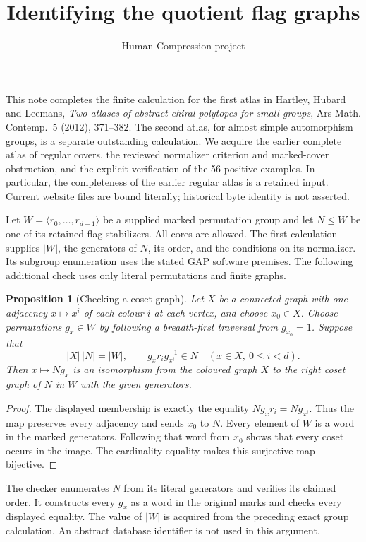 \documentclass[11pt,a4paper]{article}
\title{Identifying the quotient flag graphs}
\author{Human Compression project}\date{}
\newtheorem{proposition}{Proposition}
\begin{document}
\maketitle
This note completes the finite calculation for the first atlas in
Hartley, Hubard and Leemans, \emph{Two atlases of abstract chiral polytopes
for small groups}, Ars Math. Contemp.~5 (2012), 371--382. The second atlas,
for almost simple automorphism groups, is a separate outstanding calculation.
We acquire the earlier complete atlas of regular covers, the reviewed
normalizer criterion and marked-cover obstruction, and the explicit
verification of the 56 positive examples. In particular, the completeness
of the earlier regular atlas is a retained input. Current website files
are bound literally; historical byte identity is not asserted.

Let $W=\langle r_0,\ldots,r_{d-1}\rangle$ be a supplied marked permutation
group and let $N\le W$ be one of its retained flag stabilizers. All cores
are allowed. The first calculation supplies $|W|$, the generators of $N$,
its order, and the conditions on its normalizer. Its subgroup enumeration
uses the stated GAP software premises. The following additional check
uses only literal permutations and finite graphs.

\begin{proposition}[Checking a coset graph]
Let $X$ be a connected graph with one adjacency $x\mapsto x^i$ of each
colour $i$ at each vertex, and choose $x_0\in X$. Choose permutations
$g_x\in W$ by following a breadth-first traversal from $g_{x_0}=1$.
Suppose that
\[
 |X|\,|N|=|W|,
 \qquad g_xr_i g_{x^i}^{-1}\in N\quad(x\in X,\ 0\le i<d).
\]
Then $x\mapsto Ng_x$ is an isomorphism from the coloured graph $X$ to
the right coset graph of $N$ in $W$ with the given generators.
\end{proposition}
\begin{proof}
The displayed membership is exactly the equality
$Ng_xr_i=Ng_{x^i}$. Thus the map preserves every adjacency and sends
$x_0$ to $N$. Every element of $W$ is a word in the marked generators.
Following that word from $x_0$ shows that every coset occurs in the image.
The cardinality equality makes this surjective map bijective.
\end{proof}
The checker enumerates $N$ from its literal generators and verifies its
claimed order. It constructs every $g_x$ as a word in the original marks
and checks every displayed equality. The value of $|W|$ is acquired from
the preceding exact group calculation. An abstract database identifier
is not used in this argument.
\end{document}
